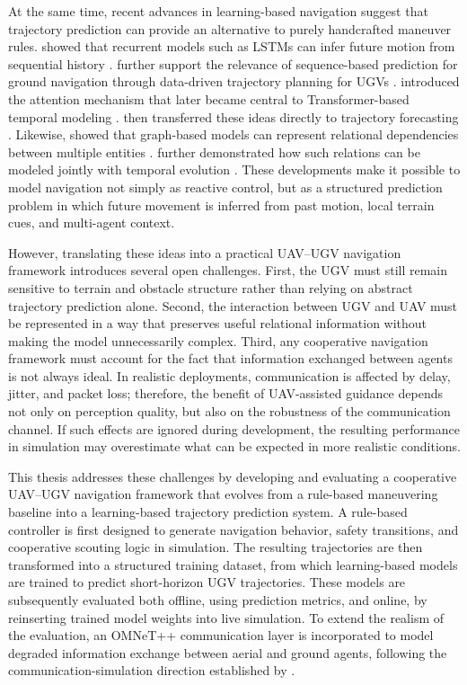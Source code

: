 At the same time, recent advances in learning-based navigation suggest that trajectory prediction can provide an alternative to purely handcrafted maneuver rules. \citeauthor{alahi2016sociallstm} showed that recurrent models such as LSTMs can infer future motion from sequential history \citep{alahi2016sociallstm}. \citeauthor{chen2024data} further support the relevance of sequence-based prediction for ground navigation through data-driven trajectory planning for UGVs \citep{chen2024data}. \citeauthor{vaswani2023attention} introduced the attention mechanism that later became central to Transformer-based temporal modeling \citep{vaswani2023attention}. \citeauthor{giuliari2020transformer} then transferred these ideas directly to trajectory forecasting \citep{giuliari2020transformer}. Likewise, \citeauthor{kipf2017semi} showed that graph-based models can represent relational dependencies between multiple entities \citep{kipf2017semi}. \citeauthor{yu2018stgcn} further demonstrated how such relations can be modeled jointly with temporal evolution \citep{yu2018stgcn}. These developments make it possible to model navigation not simply as reactive control, but as a structured prediction problem in which future movement is inferred from past motion, local terrain cues, and multi-agent context.

However, translating these ideas into a practical UAV--UGV navigation framework introduces several open challenges. First, the UGV must still remain sensitive to terrain and obstacle structure rather than relying on abstract trajectory prediction alone. Second, the interaction between UGV and UAV must be represented in a way that preserves useful relational information without making the model unnecessarily complex. Third, any cooperative navigation framework must account for the fact that information exchanged between agents is not always ideal. In realistic deployments, communication is affected by delay, jitter, and packet loss; therefore, the benefit of UAV-assisted guidance depends not only on perception quality, but also on the robustness of the communication channel. If such effects are ignored during development, the resulting performance in simulation may overestimate what can be expected in more realistic conditions.

This thesis addresses these challenges by developing and evaluating a cooperative UAV--UGV navigation framework that evolves from a rule-based maneuvering baseline into a learning-based trajectory prediction system. A rule-based controller is first designed to generate navigation behavior, safety transitions, and cooperative scouting logic in simulation. The resulting trajectories are then transformed into a structured training dataset, from which learning-based models are trained to predict short-horizon UGV trajectories. These models are subsequently evaluated both offline, using prediction metrics, and online, by reinserting trained model weights into live simulation. To extend the realism of the evaluation, an OMNeT++ communication layer is incorporated to model degraded information exchange between aerial and ground agents, following the communication-simulation direction established by \citeauthor{varga2008omnet} \citep{varga2008omnet}.


